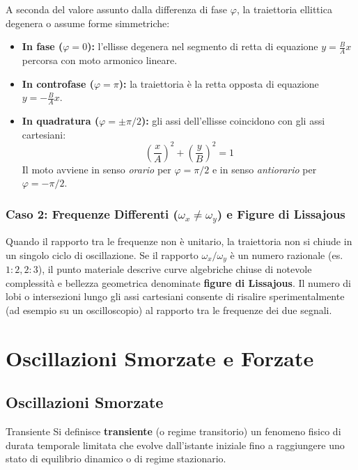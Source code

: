 A seconda del valore assunto dalla differenza di fase $\varphi$, la traiettoria ellittica degenera o assume forme simmetriche:
\begin{itemize}
    \item \textbf{In fase ($\varphi = 0$):} l'ellisse degenera nel segmento di retta di equazione $y = \frac{B}{A}x$ percorsa con moto armonico lineare.
    \item \textbf{In controfase ($\varphi = \pi$):} la traiettoria è la retta opposta di equazione $y = -\frac{B}{A}x$.
    \item \textbf{In quadratura ($\varphi = \pm\pi/2$):} gli assi dell'ellisse coincidono con gli assi cartesiani:
    \begin{equation}
    \left(\frac{x}{A}\right)^2 + \left(\frac{y}{B}\right)^2 = 1
\end{equation}
    Il moto avviene in senso \emph{orario} per $\varphi = \pi/2$ e in senso \emph{antiorario} per $\varphi = -\pi/2$.
\end{itemize}

\subsubsection{Caso 2: Frequenze Differenti ($\omega_x \neq \omega_y$) e Figure di Lissajous}
Quando il rapporto tra le frequenze non è unitario, la traiettoria non si chiude in un singolo ciclo di oscillazione. Se il rapporto $\omega_x / \omega_y$ è un numero razionale (es. $1:2, 2:3$), il punto materiale descrive curve algebriche chiuse di notevole complessità e bellezza geometrica denominate \textbf{figure di Lissajous}. Il numero di lobi o intersezioni lungo gli assi cartesiani consente di risalire sperimentalmente (ad esempio su un oscilloscopio) al rapporto tra le frequenze dei due segnali.

\section{Oscillazioni Smorzate e Forzate}
\subsection{Oscillazioni Smorzate}
\begin{definizione}{Transiente}
Si definisce \textbf{transiente} (o regime transitorio) un fenomeno fisico di durata temporale limitata che evolve dall'istante iniziale fino a raggiungere uno stato di equilibrio dinamico o di regime stazionario.
\end{definizione}

